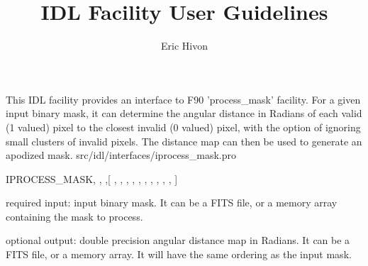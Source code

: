 
\sloppy

\title{\healpix IDL Facility User Guidelines}
 \section[iprocess\_mask]{ }
\label{idl:iprocess_mask}
\author{Eric Hivon}

\begin{facility}
{This IDL facility provides an interface to F90 'process\_mask' facility. For a
given input binary mask, it can determine the angular distance in Radians of each valid (1 valued)
pixel to the closest invalid (0 valued) pixel, with the option of ignoring small
clusters of invalid pixels. The distance map can then be used to generate an
apodized mask.}
{src/idl/interfaces/iprocess\_mask.pro}
\end{facility}

\begin{IDLformat}
{IPROCESS\_MASK, 
,  
,[
,
,
,
,
,
, 
,
, 
,
,
]}
\end{IDLformat}

\begin{qualifiers}
  \begin{qulist}{} %
   \item[mask\_in]  required input: input binary
mask. It can be a FITS file, or a memory array containing the mask to process.
    \item[distance\_map]  optional
output: double precision angular distance map in Radians. It can be a FITS file, or a
   memory array. It will have the same ordering as the input mask.
  \end{qulist}
\end{qualifiers}

